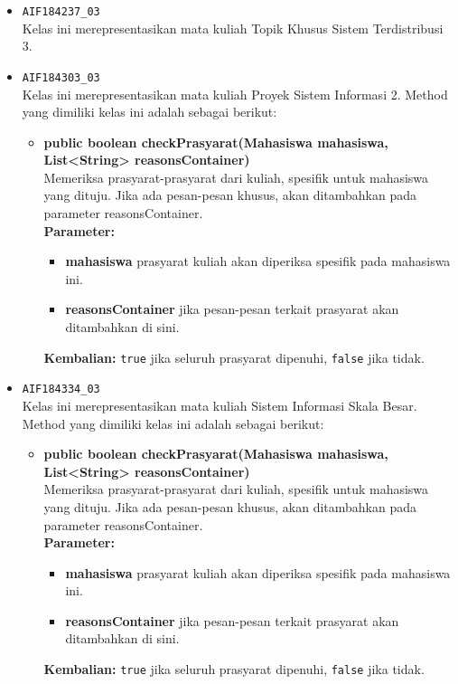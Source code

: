 \begin{enumerate}
\begin{itemize}
\begin{itemize}
		\end{itemize}
		\item \texttt{AIF184237\_03} \\
		Kelas ini merepresentasikan mata kuliah Topik Khusus Sistem Terdistribusi 3.
		\item \texttt{AIF184303\_03} \\
		Kelas ini merepresentasikan mata kuliah Proyek Sistem Informasi 2. Method yang dimiliki kelas ini adalah sebagai berikut: 
		\begin{itemize}
			\item \textbf{public boolean checkPrasyarat(Mahasiswa mahasiswa, List<String> reasonsContainer)}\\
			Memeriksa prasyarat-prasyarat dari kuliah, spesifik untuk mahasiswa yang dituju. Jika ada pesan-pesan khusus, akan ditambahkan pada parameter reasonsContainer.\\
			\textbf{Parameter:}
			\begin{itemize}
				\item \textbf{mahasiswa} prasyarat kuliah akan diperiksa spesifik pada mahasiswa ini.
				\item \textbf{reasonsContainer} jika pesan-pesan terkait prasyarat akan ditambahkan di sini.
			\end{itemize}
			\textbf{Kembalian:} \texttt{true} jika seluruh prasyarat dipenuhi, \texttt{false} jika tidak.
		\end{itemize}
		\item \texttt{AIF184334\_03} \\
		Kelas ini merepresentasikan mata kuliah Sistem Informasi Skala Besar. Method yang dimiliki kelas ini adalah sebagai berikut: 
		\begin{itemize}
			\item \textbf{public boolean checkPrasyarat(Mahasiswa mahasiswa, List<String> reasonsContainer)}\\
			Memeriksa prasyarat-prasyarat dari kuliah, spesifik untuk mahasiswa yang dituju. Jika ada pesan-pesan khusus, akan ditambahkan pada parameter reasonsContainer.\\
			\textbf{Parameter:}
			\begin{itemize}
				\item \textbf{mahasiswa} prasyarat kuliah akan diperiksa spesifik pada mahasiswa ini.
				\item \textbf{reasonsContainer} jika pesan-pesan terkait prasyarat akan ditambahkan di sini.
			\end{itemize}
			\textbf{Kembalian:} \texttt{true} jika seluruh prasyarat dipenuhi, \texttt{false} jika tidak.

\end{itemize}
\end{itemize}
\end{enumerate}
